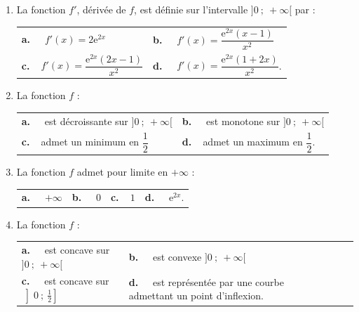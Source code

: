 \documentclass[10pt]{article}
\providecommand{\e}{{\mathrm{e}}}
\begin{document}
\begin{enumerate}
\item La fonction $f'$, dérivée de $f$, est définie sur l'intervalle $]0~;~+\infty[$ par :

\begin{tabularx}{\linewidth}{*{2}{X}}
\textbf{a.~~} $f'(x) = 2\e^{2x}$ 					&\textbf{b.~~} $f'(x)=\dfrac{\e^{2x}(x-1)}{x^2} $\\[0.35cm]
\textbf{c.~~}$ f'(x) = \dfrac{\e^{2x}(2x - 1)}{x^2}$& \textbf{d.~~} $f'(x)=\dfrac{\e^{2x}(1 + 2x)}{x^2} $.\\
\end{tabularx}

\item La fonction $f$ :

\begin{tabularx}{\linewidth}{*{2}{X}}
\textbf{a.~~} est décroissante sur $]0~;~+\infty[ $ &\textbf{b.~~} est monotone sur $]0~;~+\infty[$\\
\textbf{c.~~}admet un minimum en $\dfrac{1}{2}$		& \textbf{d.~~}admet un maximum en $\dfrac{1}{2}$.
\end{tabularx}
\item  La fonction $f$ admet pour limite en $+ \infty$ :

\begin{tabularx}{\linewidth}{*{4}{X}}
\textbf{a.~~} $+\infty $ &\textbf{b.~~} $0$&\textbf{c.~~}$1$& \textbf{d.~~} $\e^{2x}$.
\end{tabularx}
\item  La fonction $f$ :

\begin{tabularx}{\linewidth}{*{4}{X}}
\textbf{a.~~} est concave sur $]0~;~+\infty[$ &\textbf{b.~~} est convexe  $]0~;~+\infty[$\\
\textbf{c.~~} est concave sur $\left]0~;~\frac{1}{2}\right] $& \textbf{d.~~} est représentée par une courbe
admettant un point d'inflexion.\\
\end{tabularx}
 
\end{enumerate}

\vspace{0,5cm}
\end{document}
